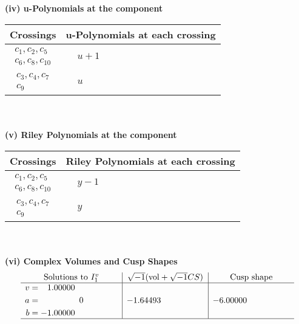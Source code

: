 \documentclass[1p]{elsarticle_modified}
\theoremstyle{definition}
\newcommand{\I}{\sqrt{-1}}
\begin{document}
\newpage\renewcommand{\arraystretch}{1}
\flushleft \textbf{(iv) u-Polynomials at the component}\newline \\
\begin{tabular}{m{50pt}|m{274pt}}
Crossings & \hspace{64pt}u-Polynomials at each crossing \\
\hline $$\begin{aligned}c_{1},c_{2},c_{5}\\c_{6},c_{8},c_{10}\end{aligned}$$&$\begin{aligned}
&u+1
\end{aligned}$\\
\hline $$\begin{aligned}c_{3},c_{4},c_{7}\\c_{9}\end{aligned}$$&$\begin{aligned}
&u
\end{aligned}$\\
\hline
\end{tabular}\\~\\
\newpage\renewcommand{\arraystretch}{1}
\flushleft \textbf{(v) Riley Polynomials at the component}\newline \\
\begin{tabular}{m{50pt}|m{274pt}}
Crossings & \hspace{64pt}Riley Polynomials at each crossing \\
\hline $$\begin{aligned}c_{1},c_{2},c_{5}\\c_{6},c_{8},c_{10}\end{aligned}$$&$\begin{aligned}
&y-1
\end{aligned}$\\
\hline $$\begin{aligned}c_{3},c_{4},c_{7}\\c_{9}\end{aligned}$$&$\begin{aligned}
&y
\end{aligned}$\\
\hline
\end{tabular}\\~\\
\newpage\flushleft \textbf{(vi) Complex Volumes and Cusp Shapes}
$$\begin{array}{c|c|c}  
\text{Solutions to }I^v_{1}& \I (\text{vol} + \sqrt{-1}CS) & \text{Cusp shape}\\
 \hline 
\begin{aligned}
v &= \phantom{-}1.00000\phantom{ +0.000000I} \\
a &= \phantom{-0.000000 } 0 \\
b &= -1.00000\phantom{ +0.000000I}\end{aligned}
 & -1.64493\phantom{ +0.000000I} & -6.00000\phantom{ +0.000000I}\\
 \hline 
 \end{array}$$\newpage
\end{document}

